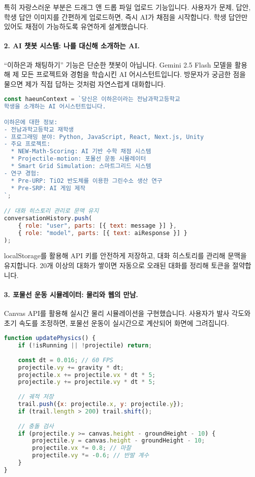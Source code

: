 특히 자랑스러운 부분은 드래그 앤 드롭 파일 업로드 기능입니다. 사용자가 문제, 답안, 학생 답안 이미지를 간편하게 업로드하면, 즉시 AI가 채점을 시작합니다. 학생 답안만 있어도 채점이 가능하도록 유연하게 설계했습니다.

\paragraph{2. AI 챗봇 시스템: 나를 대신해 소개하는 AI.}
``이하은과 채팅하기'' 기능은 단순한 챗봇이 아닙니다. Gemini 2.5 Flash 모델을 활용해 제 모든 프로젝트와 경험을 학습시킨 AI 어시스턴트입니다. 방문자가 궁금한 점을 물으면 제가 직접 답하는 것처럼 자연스럽게 대화합니다.

\begin{lstlisting}[language=JavaScript]
const haeunContext = `당신은 이하은이라는 전남과학고등학교 
학생을 소개하는 AI 어시스턴트입니다.

이하은에 대한 정보:
- 전남과학고등학교 재학생
- 프로그래밍 분야: Python, JavaScript, React, Next.js, Unity
- 주요 프로젝트:
  * NEW-Math-Scoring: AI 기반 수학 채점 시스템
  * Projectile-motion: 포물선 운동 시뮬레이터
  * Smart Grid Simulation: 스마트그리드 시스템
- 연구 경험:
  * Pre-URP: TiO2 반도체를 이용한 그린수소 생산 연구
  * Pre-SRP: AI 게임 제작
`;

// 대화 히스토리 관리로 문맥 유지
conversationHistory.push(
    { role: "user", parts: [{ text: message }] },
    { role: "model", parts: [{ text: aiResponse }] }
);
\end{lstlisting}

localStorage를 활용해 API 키를 안전하게 저장하고, 대화 히스토리를 관리해 문맥을 유지합니다. 20개 이상의 대화가 쌓이면 자동으로 오래된 대화를 정리해 토큰을 절약합니다.

\paragraph{3. 포물선 운동 시뮬레이터: 물리와 웹의 만남.}
Canvas API를 활용해 실시간 물리 시뮬레이션을 구현했습니다. 사용자가 발사 각도와 초기 속도를 조정하면, 포물선 운동이 실시간으로 계산되어 화면에 그려집니다.

\begin{lstlisting}[language=JavaScript]
function updatePhysics() {
    if (!isRunning || !projectile) return;
    
    const dt = 0.016; // 60 FPS
    projectile.vy += gravity * dt;
    projectile.x += projectile.vx * dt * 5;
    projectile.y += projectile.vy * dt * 5;
    
    // 궤적 저장
    trail.push({x: projectile.x, y: projectile.y});
    if (trail.length > 200) trail.shift();
    
    // 충돌 검사
    if (projectile.y >= canvas.height - groundHeight - 10) {
        projectile.y = canvas.height - groundHeight - 10;
        projectile.vx *= 0.8; // 마찰
        projectile.vy *= -0.6; // 반발 계수
    }
}
\end{lstlisting}

